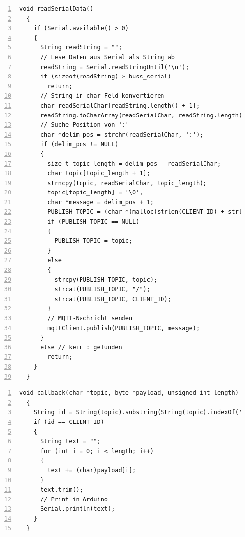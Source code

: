 \documentclass[12pt, letterpaper]{article}
\begin{document}
\begin{lstlisting}[frame=single, style=cpp, numbers=left, label={lst:esp8266readserial}, caption={ESP8266: readSerialData}]
  void readSerialData()
  {
    if (Serial.available() > 0)
    {
      String readString = "";
      // Lese Daten aus Serial als String ab
      readString = Serial.readStringUntil('\n');
      if (sizeof(readString) > buss_serial)
        return;
      // String in char-Feld konvertieren
      char readSerialChar[readString.length() + 1];
      readString.toCharArray(readSerialChar, readString.length() + 1);    
      // Suche Position von ':'
      char *delim_pos = strchr(readSerialChar, ':');
      if (delim_pos != NULL)
      {
        size_t topic_length = delim_pos - readSerialChar;
        char topic[topic_length + 1];
        strncpy(topic, readSerialChar, topic_length);
        topic[topic_length] = '\0';
        char *message = delim_pos + 1;
        PUBLISH_TOPIC = (char *)malloc(strlen(CLIENT_ID) + strlen(topic) + 2);
        if (PUBLISH_TOPIC == NULL)
        {
          PUBLISH_TOPIC = topic;
        }
        else
        {
          strcpy(PUBLISH_TOPIC, topic);
          strcat(PUBLISH_TOPIC, "/");
          strcat(PUBLISH_TOPIC, CLIENT_ID);
        }
        // MQTT-Nachricht senden
        mqttClient.publish(PUBLISH_TOPIC, message);
      }
      else // kein : gefunden
        return;
    }
  }
\end{lstlisting}

\begin{lstlisting}[frame=single, style=cpp, numbers=left, label={lst:esp8266callback}, caption={ESP8266: callback}]
  void callback(char *topic, byte *payload, unsigned int length)
  {
    String id = String(topic).substring(String(topic).indexOf('/') + 1);
    if (id == CLIENT_ID)
    {
      String text = "";
      for (int i = 0; i < length; i++)
      {
        text += (char)payload[i];
      }
      text.trim();
      // Print in Arduino
      Serial.println(text);
    }
  }
\end{lstlisting}
\end{document}
